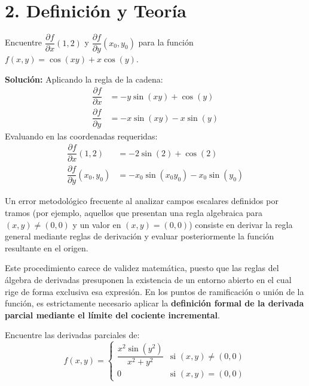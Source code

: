 \documentclass[11pt]{article}
\newenvironment{teoria}{%
  \section*{2. Definición y Teoría}%
}{}
\newenvironment{alerta}[1]{%
  \begin{tcolorbox}[colback=red!5,colframe=red!80!black,title=Advertencia Metodológica: #1]%
}{%
  \end{tcolorbox}%
}
\newenvironment{ejemplo}[1]{%
  \begin{tcolorbox}[colback=white,colframe=gray!40,title=Ejemplo: #1]%
}{%
  \end{tcolorbox}%
}
\begin{document}
\begin{teoria}
  \begin{ejemplo}{Cálculo y Evaluación Puntual}
    Encuentre $\displaystyle \dfrac{\partial f}{\partial x}(1,2)$ y $\displaystyle \dfrac{\partial f}{\partial y}(x_0, y_0)$ para la función $f(x,y) = \cos(xy) + x\cos(y)$.
    
    \textbf{Solución:}
    Aplicando la regla de la cadena:
    \begin{align*}
      \displaystyle \dfrac{\partial f}{\partial x} &= -y\sin(xy) + \cos(y) \\
      \displaystyle \dfrac{\partial f}{\partial y} &= -x\sin(xy) - x\sin(y)
    \end{align*}
    Evaluando en las coordenadas requeridas:
    \begin{align*}
      \displaystyle \dfrac{\partial f}{\partial x}(1,2) &= -2\sin(2) + \cos(2) \\
      \displaystyle \dfrac{\partial f}{\partial y}(x_0, y_0) &= -x_0\sin(x_0 y_0) - x_0\sin(y_0)
    \end{align*}
  \end{ejemplo}

  \begin{alerta}{Derivación Inválida en Puntos de Ramificación}
    Un error metodológico frecuente al analizar campos escalares definidos por tramos (por ejemplo, aquellos que presentan una regla algebraica para $(x,y) \neq (0,0)$ y un valor en $(x,y) = (0,0)$) consiste en derivar la regla general mediante reglas de derivación y evaluar posteriormente la función resultante en el origen. 
    
    Este procedimiento carece de validez matemática, puesto que las reglas del álgebra de derivadas presuponen la existencia de un entorno abierto en el cual rige de forma exclusiva esa expresión. En los puntos de ramificación o unión de la función, es estrictamente necesario aplicar la \textbf{definición formal de la derivada parcial mediante el límite del cociente incremental}.
  \end{alerta}

  \begin{ejemplo}{Derivadas Parciales de una Función Definida a Tramos}
    Encuentre las derivadas parciales de:
    $$ f(x,y) = \begin{cases} \displaystyle \dfrac{x^2\sin(y^2)}{x^2 + y^2} & \text{si } (x,y) \neq (0,0) \\[1em] 0 & \text{si } (x,y) = (0,0) \end{cases} $$
    

\end{ejemplo}
\end{teoria}
\end{document}
